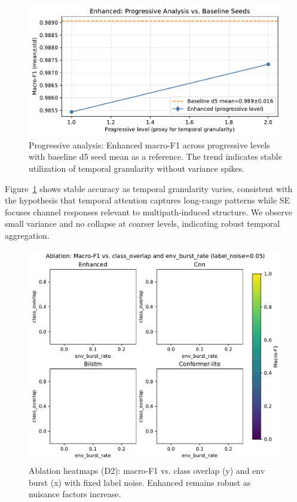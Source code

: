 \documentclass[journal]{IEEEtran}
\begin{document}
\begin{figure}[t]
\centering
\includegraphics[width=\columnwidth]{plots/d5_progressive_enhanced.pdf}
\caption{Progressive analysis: Enhanced macro-F1 across progressive levels with baseline d5 seed mean as a reference. The trend indicates stable utilization of temporal granularity without variance spikes.}
\label{fig:d5_prog}
\end{figure}

Figure~\ref{fig:d5_prog} shows stable accuracy as temporal granularity varies, consistent with the hypothesis that temporal attention captures long-range patterns while SE focuses channel responses relevant to multipath-induced structure. We observe small variance and no collapse at coarser levels, indicating robust temporal aggregation.

\begin{figure}[t]
\centering
\includegraphics[width=\columnwidth]{plots/ablation_noise_env.pdf}
\caption{Ablation heatmaps (D2): macro-F1 vs. class overlap (y) and env burst (x) with fixed label noise. Enhanced remains robust as nuisance factors increase.}
\label{fig:ablation_d2}
\end{figure}
\end{document}
